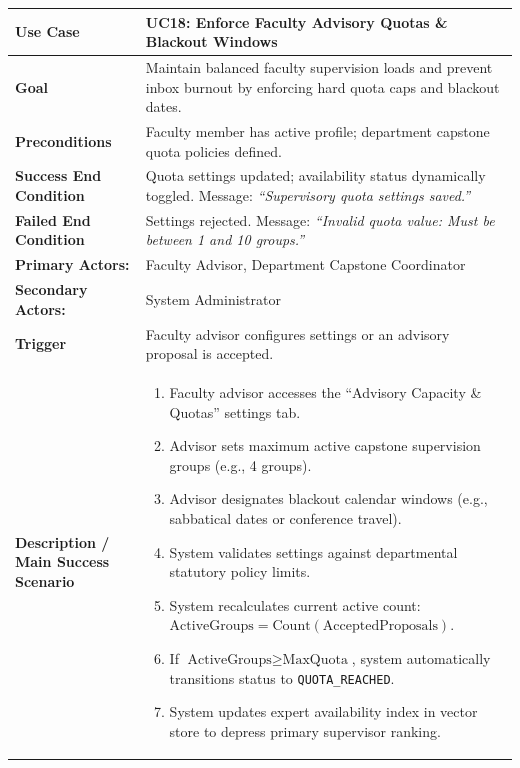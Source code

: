 \begin{table}[H]
\centering
\small
\begin{tabularx}{\textwidth}{|l|X|}
\hline
\rowcolor{lightgray!40} \textbf{Use Case} & \textbf{UC18: Enforce Faculty Advisory Quotas \& Blackout Windows} \\ \hline
\textbf{Goal} & Maintain balanced faculty supervision loads and prevent inbox burnout by enforcing hard quota caps and blackout dates. \\ \hline
\textbf{Preconditions} & Faculty member has active profile; department capstone quota policies defined. \\ \hline
\textbf{Success End Condition} & Quota settings updated; availability status dynamically toggled. Message: \textit{``Supervisory quota settings saved.''} \\ \hline
\textbf{Failed End Condition} & Settings rejected. Message: \textit{``Invalid quota value: Must be between 1 and 10 groups.''} \\ \hline
\textbf{Primary Actors:} & Faculty Advisor, Department Capstone Coordinator \\
\textbf{Secondary Actors:} & System Administrator \\ \hline
\textbf{Trigger} & Faculty advisor configures settings or an advisory proposal is accepted. \\ \hline
\textbf{Description / Main Success Scenario} &
\begin{enumerate}[leftmargin=*]
    \item Faculty advisor accesses the ``Advisory Capacity \& Quotas'' settings tab.
    \item Advisor sets maximum active capstone supervision groups (e.g., 4 groups).
    \item Advisor designates blackout calendar windows (e.g., sabbatical dates or conference travel).
    \item System validates settings against departmental statutory policy limits.
    \item System recalculates current active count: $\text{ActiveGroups} = \text{Count}(\text{AcceptedProposals})$.
    \item If $\text{ActiveGroups} \ge \text{MaxQuota}$, system automatically transitions status to \texttt{QUOTA\_REACHED}.
    \item System updates expert availability index in vector store to depress primary supervisor ranking.
\end{enumerate} \\ \hline

\end{tabularx}
\end{table}
